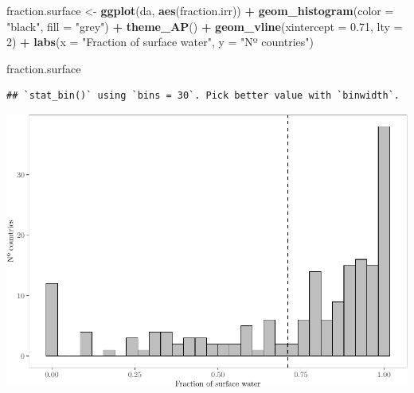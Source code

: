 \documentclass[
  11pt,
]{article}
\newenvironment{Shaded}{\begin{snugshade}}{\end{snugshade}}
\newcommand{\AttributeTok}[1]{\textcolor[rgb]{0.13,0.29,0.53}{#1}}
\newcommand{\DecValTok}[1]{\textcolor[rgb]{0.00,0.00,0.81}{#1}}
\newcommand{\FloatTok}[1]{\textcolor[rgb]{0.00,0.00,0.81}{#1}}
\newcommand{\FunctionTok}[1]{\textcolor[rgb]{0.13,0.29,0.53}{\textbf{#1}}}
\newcommand{\NormalTok}[1]{#1}
\newcommand{\OtherTok}[1]{\textcolor[rgb]{0.56,0.35,0.01}{#1}}
\newcommand{\SpecialCharTok}[1]{\textcolor[rgb]{0.81,0.36,0.00}{\textbf{#1}}}
\newcommand{\StringTok}[1]{\textcolor[rgb]{0.31,0.60,0.02}{#1}}
\begin{document}
\begin{Shaded}
\begin{Highlighting}[]
\NormalTok{fraction.surface }\OtherTok{\textless{}{-}} \FunctionTok{ggplot}\NormalTok{(da, }\FunctionTok{aes}\NormalTok{(fraction.irr)) }\SpecialCharTok{+}
  \FunctionTok{geom\_histogram}\NormalTok{(}\AttributeTok{color =} \StringTok{"black"}\NormalTok{, }\AttributeTok{fill =} \StringTok{"grey"}\NormalTok{) }\SpecialCharTok{+} 
  \FunctionTok{theme\_AP}\NormalTok{() }\SpecialCharTok{+} 
  \FunctionTok{geom\_vline}\NormalTok{(}\AttributeTok{xintercept =} \FloatTok{0.71}\NormalTok{, }\AttributeTok{lty =} \DecValTok{2}\NormalTok{) }\SpecialCharTok{+} 
  \FunctionTok{labs}\NormalTok{(}\AttributeTok{x =} \StringTok{"Fraction of surface water"}\NormalTok{, }\AttributeTok{y =} \StringTok{"Nº countries"}\NormalTok{)}

\NormalTok{fraction.surface}
\end{Highlighting}
\end{Shaded}

\begin{verbatim}
## `stat_bin()` using `bins = 30`. Pick better value with `binwidth`.
\end{verbatim}

\includegraphics{code_fallacies_water_crisis_files/figure-latex/rest-4.pdf}
\end{document}
